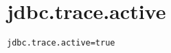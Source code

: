 \section{jdbc.trace.active}
\label{configuration:JdbcTraceActive}
\ClearAPI
\TODO
{}
\begin{lstlisting}[style=Props,caption={Usage example for \textit{jdbc.trace.active}}]
jdbc.trace.active=true
\end{lstlisting}